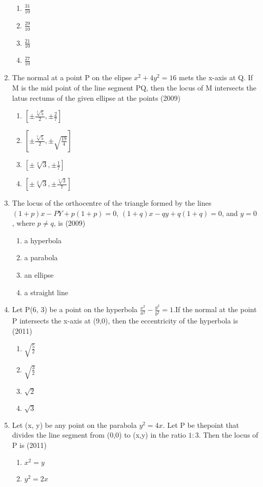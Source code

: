 \documentclass[12pt]{article}
\providecommand{\sbrak}[1]{\ensuremath{{}\left[#1\right]}}
\begin{document}
\begin{enumerate}
\begin{enumerate}
\item $\frac{31}{10}$
\item $\frac{29}{10}$
\item $\frac{21}{10}$
\item $\frac{27}{10}$
\end{enumerate}
\item  The normal at a point P on the elipse $x^2+4y^2=16$ mets the x-axis at Q. If M is the mid point of the line segment PQ, then the locus of M intersects the latus rectums of the given ellipse at the points (2009)
\begin{enumerate}
\item $\sbrak{\pm \frac{\sqrt[3]{5}}{2},\pm \frac{2}{7}}$ 
\item $\sbrak{\pm \frac{\sqrt[3]{5}}{2},\pm \sqrt{\frac{19}{4}}}$ 
\item $\sbrak{\pm \sqrt[2]{3},\pm \frac{1}{7}}$ 
\item $\sbrak{\pm \sqrt[2]{3},\pm \frac{\sqrt[4]{3}}{7}}$ 
\end{enumerate}
\item The locus of the orthocentre of the triangle formed by the lines
$(1+p)x-PY+p(1+p)=0$,
$(1+q)x-qy+q(1+q)=0$, 
and $y=0$, where $p\neq q$, is (2009)
\begin{enumerate}
\item a hyperbola
\item a parabola
\item an ellipse
\item a straight line
\end{enumerate}
\item Let P(6, 3) be a point on the hyperbola $\frac{x^2}{a^2}-\frac{y^2}{b^2}=1$.If the
normal at the point P intersects the x-axis at (9,0), then the eccentricity of the hyperbola is (2011)
\begin{enumerate}
\item $\sqrt{\frac{5}{2}}$
\item $\sqrt{\frac{3}{2}}$
\item $\sqrt{2}$
\item $\sqrt{3}$
\end{enumerate}
\item Let (x, y) be any point on the parabola $y^2=4x$. Let P be thepoint that divides the line segment from (0,0) to (x,y) in the ratio $1:3$. Then the locus of P is (2011)
\begin{enumerate}
\item $x^2=y$
\item $y^2=2x$

\end{enumerate}
\end{enumerate}
\end{document}
